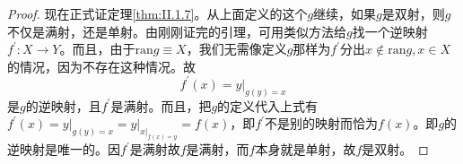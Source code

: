 \documentclass[../main.tex]{subfiles}
\begin{document}
\begin{proof}
    现在正式证定理\ref{thm:II.1.7}。从上面定义的这个$g$继续，如果$g$是双射，则$g$不仅是满射，还是单射。由刚刚证完的引理，可用类似方法给$g$找一个逆映射$f^\prime:X\rightarrow Y$。而且，由于$\mathrm{ran}g\equiv X$，我们无需像定义$g$那样为$f^\prime$分出$x\notin\mathrm{ran}g,x\in X$的情况，因为不存在这种情况。故
    \[
        f^\prime\left(x\right)=\left.y\right|_{g\left(y\right)=x}
    \]
    是$g$的逆映射，且$f^\prime$是满射。而且，把$g$的定义代入上式有$f^\prime\left(x\right)=\left.y\right|_{g\left(y\right)=x}=\left.y\right|_{\left.x\right|_{f\left(x\right)=y}}=f\left(x\right)$，即$f^\prime$不是别的映射而恰为$f\left(x\right)$。即$g$的逆映射是唯一的。因$f^\prime$是满射故$f$是满射，而$f$本身就是单射，故$f$是双射。
\end{proof}
\end{document}
